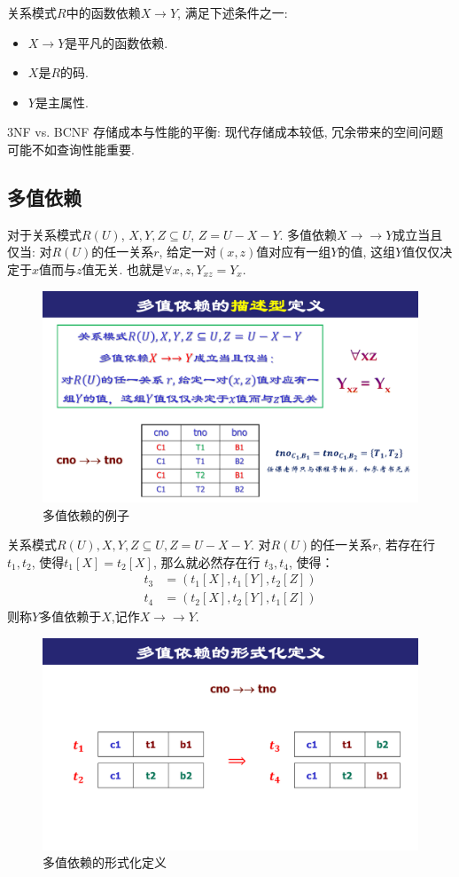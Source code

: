 \begin{definition}[3NF]
  关系模式$R$中的函数依赖$X\to Y$, 满足下述条件之一:
  \begin{itemize}
    \item $X\to Y$是平凡的函数依赖.
    \item $X$是$R$的码.
    \item $Y$是主属性.
  \end{itemize}
\end{definition}

3NF vs. BCNF\quad
存储成本与性能的平衡: 现代存储成本较低, 冗余带来的空间问题可能不如查询性能重要.

\subsection{多值依赖}

\begin{definition}[多值依赖的描述型定义]
  对于关系模式$R(U)$, $X,Y,Z\subseteq U$, $Z=U-X-Y$. 多值依赖$X\to\to Y$成立当且仅当:
  对$R(U)$的任一关系$r$, 给定一对$(x,z)$值对应有一组$Y$的值, 这组$Y$值仅仅决定于$x$值而与$z$值无关. 也就是$\forall x,z, Y_{xz} = Y_x$.
\end{definition}

\begin{figure}[H]
    \centering
    \includegraphics[width=.4\textwidth]{./figure/多值依赖.pdf}
    \caption{多值依赖的例子}
\end{figure}

\begin{definition}[多值依赖的形式化定义]
  关系模式$R(U), X, Y, Z \subseteq U, Z = U - X - Y$.
  对$R(U)$的任一关系$r$, 若存在行$t_1, t_2$, 使得$t_1[X] = t_2[X]$,
  那么就必然存在行 $t_3, t_4$, 使得：
  \begin{align*}
    t_3 &= (t_1[X], t_1[Y], t_2[Z]) \\
    t_4 &= (t_2[X], t_2[Y], t_1[Z]) 
  \end{align*}
  则称$Y$多值依赖于$X$,记作$X \to\to Y$.
\end{definition}

\begin{figure}[H]
    \centering
    \includegraphics[width=.7\textwidth]{./figure/多值依赖的形式化定义.pdf}
    \caption{多值依赖的形式化定义}
\end{figure}

